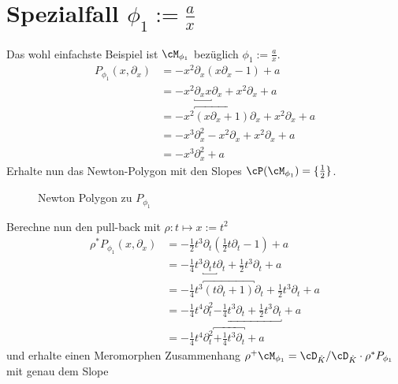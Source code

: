 \section{Spezialfall $\phi_1:=\frac{a}{x}$}
Das wohl einfachste Beispiel ist $\cM_{\phi_1}$ bezüglich
$\phi_1:=\frac{a}{x}$.
\begin{align*}
P_{\phi_1}(x,\partial_x) &=-x^2\partial_x (x\partial_x-1)+a \\
  &=-x^2\underbracket{\partial_xx}\partial_x+x^2\partial_x+a \\
  &=-x^2\overbracket{(x\partial_x+1)}\partial_x+x^2\partial_x+a \\
  &=-x^3\partial_x^2 - x^2\partial_x+x^2\partial_x+a \\
  &=-x^3\partial_x^2+a
\end{align*}
Erhalte nun das Newton-Polygon mit den Slopes
$\cP(\cM_{\phi_1})=\{\frac{1}{2}\}$.
\begin{figure}[H]
\caption{Newton Polygon zu $P_{\phi_1}$}
\begin{center}
\end{center}
\end{figure}
Berechne nun den pull-back mit $\rho:t\mapsto x:=t^2$
\begin{align*}
\rho^*P_{\phi_1}(x,\partial_x)
  &=-\frac{1}{2}t^{3}\partial_t
    (\frac{1}{2}t\partial_t-1)+a\\
  &=-\frac{1}{4}t^{3}\underbracket{\partial_tt}\partial_t
    +\frac{1}{2}t^{3}\partial_t+a\\
  &=-\frac{1}{4}t^{3}\overbracket{(t\partial_t+1)}\partial_t
    +\frac{1}{2}t^{3}\partial_t+a\\
  &=-\frac{1}{4}t^{4}\partial_t^2
    \underbracket{-\frac{1}{4}t^{3}\partial_t+\frac{1}{2}t^{3}\partial_t}+a\\
  &=-\frac{1}{4}t^{4}\partial_t^2
    \overbracket{+\frac{1}{4}t^{3}\partial_t}+a
\end{align*}
und erhalte einen Meromorphen Zusammenhang $\rho^+\cM_{\phi_1}=\cD_{\hat
K}/\cD_{\hat K}\cdot\rho^*P_{\phi_1}$ mit genau dem Slope
